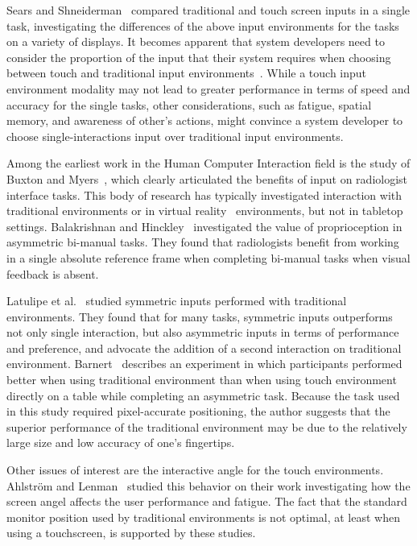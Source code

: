 \documentclass{sigchi}
\begin{document}
Sears and Shneiderman~\cite{sears1991high} compared traditional and touch screen inputs in a single task, investigating the differences of the above input environments for the tasks on a variety of displays. It becomes apparent that system developers need to consider the proportion of the input that their system requires when choosing between touch and traditional input environments~\cite{forlines2007direct}. While a touch input environment modality may not lead to greater performance in terms of speed and accuracy for the single tasks, other considerations, such as fatigue, spatial memory, and awareness of other’s actions, might convince a system developer to choose single-interactions input over traditional input environments.

Among the earliest work in the Human Computer Interaction field is the study of Buxton and Myers~\cite{kabbash1994two}, which clearly articulated the benefits of input on radiologist interface tasks. This body of research has typically investigated interaction with traditional environments or in virtual reality~\cite{sousa2017vrrrroom} environments, but not in tabletop settings. Balakrishnan and Hinckley~\cite{balakrishnan1999role} investigated the value of proprioception in asymmetric bi-manual tasks. They found that radiologists benefit from working in a single absolute reference frame when completing bi-manual tasks when visual feedback is absent.

Latulipe et al.~\cite{latulipe2005bimanual, latulipe2006symspline} studied symmetric inputs performed with traditional environments. They found that for many tasks, symmetric inputs outperforms not only single interaction, but also asymmetric inputs in terms of performance and preference, and advocate the addition of a second interaction on traditional environment. Barnert~\cite{barnert2005comparison} describes an experiment in which participants performed better when using traditional environment than when using touch environment directly on a table while completing an asymmetric task. Because the task used in this study required pixel-accurate positioning, the author suggests that the superior performance of the traditional environment may be due to the relatively large size and low accuracy of one’s fingertips.

Other issues of interest are the interactive angle for the touch environments. Ahlstr\"{o}m and Lenman~\cite{ahlstrom1990fatigue} studied this behavior on their work investigating how the screen angel affects the user performance and fatigue. The fact that the standard monitor position used by traditional environments is not optimal, at least when using a touchscreen, is supported by these studies.
\end{document}
